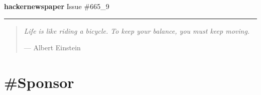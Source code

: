 \documentclass[10pt,a4paper]{article}
\begin{document}
\thispagestyle{empty}
\Huge {} 
\noindent\textbf{hacker{\color{red}news}paper}
\normalfont
\normalsize
\hfill Issue \#665\_9

{\noindent\color{red} \rule{\linewidth}{0.5mm}}

\begin{quotation}
    \textit{
Life is like riding a bicycle. To keep your balance, you must keep moving. } \par\hfill --- Albert Einstein

 
\end{quotation}

\tableofcontents

\newpage
\pagestyle{fancy}

\section{\#Sponsor}
\end{document}
